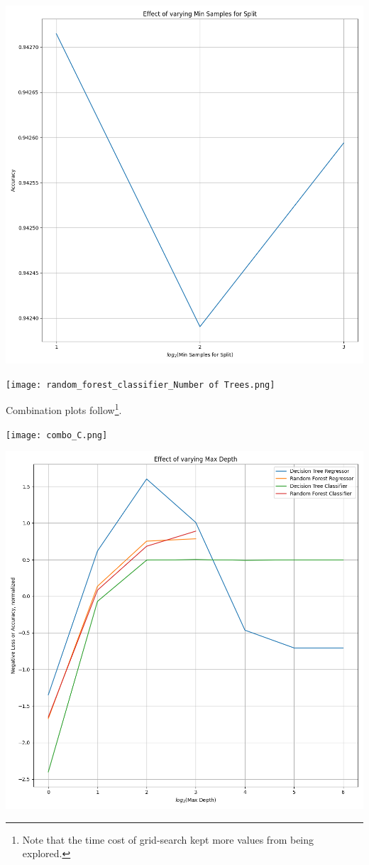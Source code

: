 \documentclass[12pt, letterpaper]{article}
\begin{document}
\includegraphics[scale=\myscale]{random_forest_classifier_Min Samples for Split.png}

\texttt{[image: random\_forest\_classifier\_Number of Trees.png]}

Combination plots follow\footnote{
Note that the time cost of grid-search kept more values from being explored.
}.

\texttt{[image: combo\_C.png]}

\includegraphics[scale=\myscale]{combo_max_depth.png}
\end{document}

